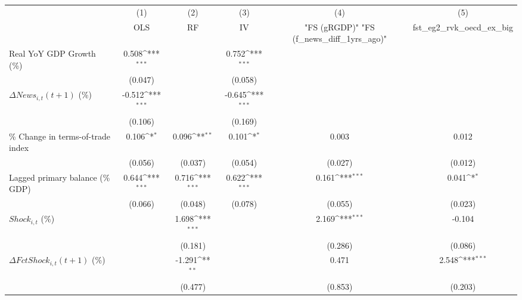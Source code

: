 {
\def\sym#1{\ifmmode^{#1}\else\(^{#1}\)\fi}
\begin{tabular}{l*{5}{c}}
\toprule
                    &\multicolumn{1}{c}{(1)}&\multicolumn{1}{c}{(2)}&\multicolumn{1}{c}{(3)}&\multicolumn{1}{c}{(4)}&\multicolumn{1}{c}{(5)}\\
                    &\multicolumn{1}{c}{OLS}&\multicolumn{1}{c}{RF}&\multicolumn{1}{c}{IV}&\multicolumn{1}{c}{ "FS (gRGDP)"  "FS (f_news_diff_1yrs_ago)" }&\multicolumn{1}{c}{fst_eg2_rvk_oecd_ex_big}\\
\midrule
Real YoY GDP Growth (\%)&       0.508\sym{***}&                     &       0.752\sym{***}&                     &                     \\
                    &     (0.047)         &                     &     (0.058)         &                     &                     \\
\addlinespace
$ \Delta News_{i,t}(t+1)$ (\%)&      -0.512\sym{***}&                     &      -0.645\sym{***}&                     &                     \\
                    &     (0.106)         &                     &     (0.169)         &                     &                     \\
\addlinespace
\% Change in terms-of-trade index&       0.106\sym{*}  &       0.096\sym{**} &       0.101\sym{*}  &       0.003         &       0.012         \\
                    &     (0.056)         &     (0.037)         &     (0.054)         &     (0.027)         &     (0.012)         \\
\addlinespace
Lagged primary balance (\% GDP)&       0.644\sym{***}&       0.716\sym{***}&       0.622\sym{***}&       0.161\sym{***}&       0.041\sym{*}  \\
                    &     (0.066)         &     (0.048)         &     (0.078)         &     (0.055)         &     (0.023)         \\
\addlinespace
$ Shock_{i,t}$ (\%) &                     &       1.698\sym{***}&                     &       2.169\sym{***}&      -0.104         \\
                    &                     &     (0.181)         &                     &     (0.286)         &     (0.086)         \\
\addlinespace
$ \Delta FctShock_{i,t}(t+1)$ (\%)&                     &      -1.291\sym{**} &                     &       0.471         &       2.548\sym{***}\\
                    &                     &     (0.477)         &                     &     (0.853)         &     (0.203)         \\

\end{tabular}}
